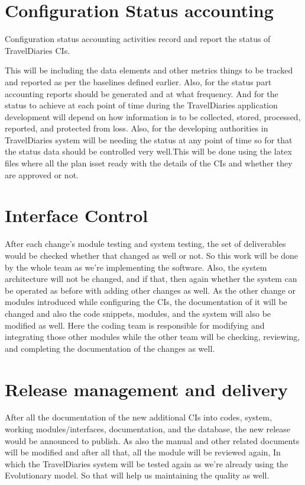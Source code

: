 \documentclass[]{article}
\begin{document}
\section{Configuration Status accounting}
Configuration status accounting activities record and report the status of TravelDiaries CIs.

This will be including the data elements and other metrics things to be tracked and reported as per the baselines defined earlier. Also, for the status part accounting reports should be generated and at what frequency. And for the status to achieve at each point of time during the TravelDiaries application development will depend on how information is to be collected, stored, processed, reported, and protected from loss. Also, for the developing authorities in TravelDiaries system will be needing the status at any point of time so for that the status data should be controlled very well.This will be done using the latex files where all the plan isset ready with the details of the CIs and whether they are approved or not.
\
\section{Interface Control}
After each change’s module testing and system testing, the set of deliverables would be checked whether that changed as well or not. So this work will be done by the whole team as we’re implementing the software. Also, the system architecture will not be changed, and if that, then again whether the system can be operated as before with adding other changes as well. As the other change or modules introduced while configuring the CIs, the documentation of it will be changed and also the code snippets, modules, and the system will also be modified as well. Here the coding team is responsible for modifying and integrating those other modules while the other team will be checking, reviewing, and completing the documentation of the changes as well.


\section{Release management and delivery}


After all the documentation of the new additional CIs into codes, system, working modules/interfaces, documentation, and the database, the new release would be announced to publish. As also the manual and other related documents will be modified and after all that, all the module will be reviewed again, In which the TravelDiaries system will be tested again as we’re already using the Evolutionary model. So that will help us maintaining the quality as well.
\end{document}
